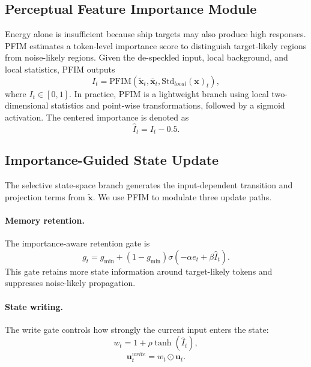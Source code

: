 \documentclass[letterpaper]{article}
\begin{document}
\subsection{Perceptual Feature Importance Module}

Energy alone is insufficient because ship targets may also produce high responses. PFIM estimates a token-level importance score to distinguish target-likely regions from noise-likely regions. Given the de-speckled input, local background, and local statistics, PFIM outputs
\begin{equation}
  I_t = \mathrm{PFIM}(\widetilde{\mathbf{x}}_t,\bar{\mathbf{x}}_t,\mathrm{Std}_{local}(\mathbf{x})_t),
\end{equation}
where $I_t\in[0,1]$. In practice, PFIM is a lightweight branch using local two-dimensional statistics and point-wise transformations, followed by a sigmoid activation. The centered importance is denoted as
\begin{equation}
  \hat{I}_t = I_t - 0.5.
\end{equation}

\subsection{Importance-Guided State Update}

The selective state-space branch generates the input-dependent transition and projection terms from $\widetilde{\mathbf{x}}$. We use PFIM to modulate three update paths.

\paragraph{Memory retention.}
The importance-aware retention gate is
\begin{equation}
  g_t = g_{\min} + (1-g_{\min})\sigma(-\alpha e_t + \beta \hat{I}_t).
  \label{eq:gamma}
\end{equation}
This gate retains more state information around target-likely tokens and suppresses noise-likely propagation.

\paragraph{State writing.}
The write gate controls how strongly the current input enters the state:
\begin{equation}
  w_t = 1 + \rho \tanh(\hat{I}_t),
\end{equation}
\begin{equation}
  \mathbf{u}^{write}_t = w_t \odot \mathbf{u}_t.
\end{equation}
\end{document}

